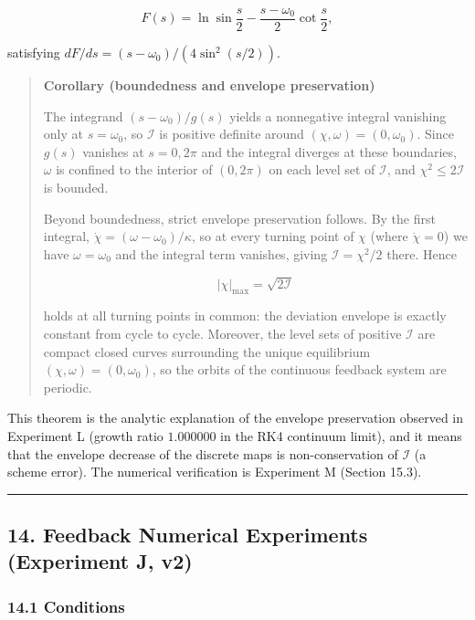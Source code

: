 \documentclass[
  a4paper,
]{article}
\begin{document}
\[
F(s)=\ln\sin\frac{s}{2}-\frac{s-\omega_0}{2}\cot\frac{s}{2},
\]

satisfying \(dF/ds=(s-\omega_0)/(4\sin^2(s/2))\).

\begin{quote}
\textbf{Corollary (boundedness and envelope preservation)}

The integrand \((s-\omega_0)/g(s)\) yields a nonnegative integral
vanishing only at \(s=\omega_0\), so \(\mathcal I\) is positive definite
around \((\chi,\omega)=(0,\omega_0)\). Since \(g(s)\) vanishes at
\(s=0,2\pi\) and the integral diverges at these boundaries, \(\omega\)
is confined to the interior of \((0,2\pi)\) on each level set of
\(\mathcal I\), and \(\chi^2\le2\mathcal I\) is bounded.

Beyond boundedness, strict envelope preservation follows. By the first
integral, \(\dot\chi=(\omega-\omega_0)/\kappa\), so at every turning
point of \(\chi\) (where \(\dot\chi=0\)) we have \(\omega=\omega_0\) and
the integral term vanishes, giving \(\mathcal I=\chi^2/2\) there. Hence

\[
\boxed{
\lvert\chi\rvert_{\max}=\sqrt{2\mathcal I}
}
\]

holds at all turning points in common: the deviation envelope is exactly
constant from cycle to cycle. Moreover, the level sets of positive
\(\mathcal I\) are compact closed curves surrounding the unique
equilibrium \((\chi,\omega)=(0,\omega_0)\), so the orbits of the
continuous feedback system are periodic.
\end{quote}

This theorem is the analytic explanation of the envelope preservation
observed in Experiment L (growth ratio \(1.000000\) in the RK4 continuum
limit), and it means that the envelope decrease of the discrete maps is
non-conservation of \(\mathcal I\) (a scheme error). The numerical
verification is Experiment M (Section 15.3).

\begin{center}\rule{0.5\linewidth}{0.5pt}\end{center}

\subsection{14. Feedback Numerical Experiments (Experiment J,
v2)}\label{feedback-numerical-experiments-experiment-j-v2}

\subsubsection{14.1 Conditions}\label{conditions}
\end{document}
